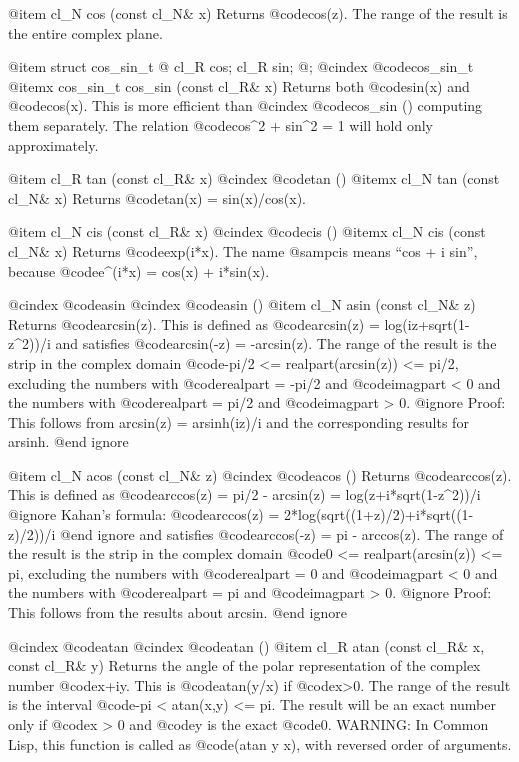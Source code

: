 @item cl_N cos (const cl_N& x)
Returns @code{cos(z)}. The range of the result is the entire complex plane.

@item struct cos_sin_t @{ cl_R cos; cl_R sin; @};
@cindex @code{cos_sin_t}
@itemx cos_sin_t cos_sin (const cl_R& x)
Returns both @code{sin(x)} and @code{cos(x)}. This is more efficient than
@cindex @code{cos_sin ()}
computing them separately. The relation @code{cos^2 + sin^2 = 1} will
hold only approximately.

@item cl_R tan (const cl_R& x)
@cindex @code{tan ()}
@itemx cl_N tan (const cl_N& x)
Returns @code{tan(x) = sin(x)/cos(x)}.

@item cl_N cis (const cl_R& x)
@cindex @code{cis ()}
@itemx cl_N cis (const cl_N& x)
Returns @code{exp(i*x)}. The name @samp{cis} means ``cos + i sin'', because
@code{e^(i*x) = cos(x) + i*sin(x)}.

@cindex @code{asin}
@cindex @code{asin ()}
@item cl_N asin (const cl_N& z)
Returns @code{arcsin(z)}. This is defined as
@code{arcsin(z) = log(iz+sqrt(1-z^2))/i} and satisfies
@code{arcsin(-z) = -arcsin(z)}.
The range of the result is the strip in the complex domain
@code{-pi/2 <= realpart(arcsin(z)) <= pi/2}, excluding the numbers
with @code{realpart = -pi/2} and @code{imagpart < 0} and the numbers
with @code{realpart = pi/2} and @code{imagpart > 0}.
@ignore
Proof: This follows from arcsin(z) = arsinh(iz)/i and the corresponding
results for arsinh.
@end ignore

@item cl_N acos (const cl_N& z)
@cindex @code{acos ()}
Returns @code{arccos(z)}. This is defined as
@code{arccos(z) = pi/2 - arcsin(z) = log(z+i*sqrt(1-z^2))/i}
@ignore
 Kahan's formula:
 @code{arccos(z) = 2*log(sqrt((1+z)/2)+i*sqrt((1-z)/2))/i}
@end ignore
and satisfies @code{arccos(-z) = pi - arccos(z)}.
The range of the result is the strip in the complex domain
@code{0 <= realpart(arcsin(z)) <= pi}, excluding the numbers
with @code{realpart = 0} and @code{imagpart < 0} and the numbers
with @code{realpart = pi} and @code{imagpart > 0}.
@ignore
Proof: This follows from the results about arcsin.
@end ignore

@cindex @code{atan}
@cindex @code{atan ()}
@item cl_R atan (const cl_R& x, const cl_R& y)
Returns the angle of the polar representation of the complex number
@code{x+iy}. This is @code{atan(y/x)} if @code{x>0}. The range of
the result is the interval @code{-pi < atan(x,y) <= pi}. The result will
be an exact number only if @code{x > 0} and @code{y} is the exact @code{0}.
WARNING: In Common Lisp, this function is called as @code{(atan y x)},
with reversed order of arguments.

